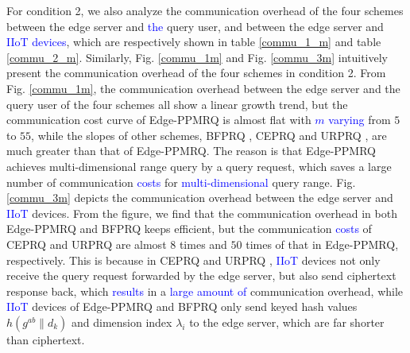 \documentclass[IEEE JOURNAL OF BIOMEDICAL AND HEALTH INFORMATICS]{IEEEtran}
\begin{document}
{    For condition 2, we also analyze the communication overhead of the four schemes between the edge server and \textcolor{blue}{the} query user, and between the edge server and \textcolor{blue}{IIoT} \textcolor{blue}{devices}, which are respectively shown in table \ref{commu_1_m} and table \ref{commu_2_m}. Similarly, Fig. \ref{commu_1m} and Fig. \ref{commu_3m} intuitively present the communication overhead of the four schemes in condition 2. From Fig. \ref{commu_1m}, the communication overhead between the edge server and the query user of the four schemes all show a linear growth trend, but the communication cost curve of Edge-PPMRQ is almost flat with \textcolor{blue}{$m$ varying} from $5$ to $55$, while the slopes of other schemes, BFPRQ \cite{mahdikhani2020IoT}, CEPRQ \cite{hasan2020IoT} and URPRQ \cite{mahdikhani2020using}, are much greater than that of Edge-PPMRQ. The reason is that Edge-PPMRQ achieves multi-dimensional range query by a query request, which saves a large number of communication \textcolor{blue}{costs} for \textcolor{blue}{multi-dimensional} query range. Fig. \ref{commu_3m} depicts the communication overhead between the edge server and \textcolor{blue}{IIoT} devices. From the figure, we find that the communication overhead in both Edge-PPMRQ and BFPRQ \cite{mahdikhani2020IoT} keeps efficient, but the communication \textcolor{blue}{costs} of CEPRQ \cite{hasan2020IoT} and URPRQ \cite{mahdikhani2020using} are almost $8$ times and $50$ times of that in Edge-PPMRQ, respectively. This is because in CEPRQ \cite{hasan2020IoT} and URPRQ \cite{mahdikhani2020using}, \textcolor{blue}{IIoT} devices not only receive the query request forwarded by the edge server, but also send ciphertext response back, which \textcolor{blue}{results} in a \textcolor{blue}{large amount of} communication overhead, while \textcolor{blue}{IIoT} devices of Edge-PPMRQ and BFPRQ \cite{mahdikhani2020IoT} only send keyed hash values $h( g^{ab} \| d_k)$ and dimension index $\lambda_i$ to the edge server, which are far shorter than ciphertext.


}
\end{document}
